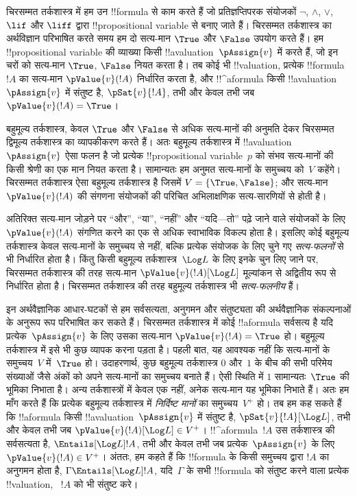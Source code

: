 \documentclass[../../../include/open-logic-section]{subfiles}
\begin{document}


चिरसम्मत तर्कशास्त्र में हम उन !!{formula} से काम करते हैं जो
प्रतिज्ञप्तिपरक संयोजकों $\lnot$, $\land$, $\lor$, $\lif$ और $\liff$ द्वारा
!!{propositional variable} से बनाए जाते हैं। चिरसम्मत तर्कशास्त्र का
अर्थविज्ञान परिभाषित करते समय हम दो सत्य-मान $\True$ और $\False$ उपयोग
करते हैं। हम !!{propositional variable} की व्याख्या किसी
!!a{valuation}~$\pAssign{v}$ में करते हैं, जो इन चरों को सत्य-मान $\True$,
$\False$ नियत करता है। तब कोई भी !!{valuation}, प्रत्येक !!{formula}~$!A$
का सत्य-मान $\pValue{v}(!A)$ निर्धारित करता है, और !!^a{formula} किसी
!!a{valuation}~$\pAssign{v}$ में संतुष्ट है, $\pSat{v}{!A}$, तभी और केवल
तभी जब $\pValue{v}(!A) = \True$।

बहुमूल्य तर्कशास्त्र, केवल $\True$ और $\False$ से अधिक सत्य-मानों की अनुमति
देकर चिरसम्मत द्विमूल्य तर्कशास्त्र का व्यापकीकरण करते हैं। अतः बहुमूल्य
तर्कशास्त्र में !!a{valuation}~$\pAssign{v}$ ऐसा फलन है जो प्रत्येक
!!{propositional variable}~$p$ को संभव सत्य-मानों की किसी श्रेणी का एक मान
नियत करता है। सामान्यतः हम अनुमत सत्य-मानों के समुच्चय को~$V$ कहेंगे।
चिरसम्मत तर्कशास्त्र ऐसा बहुमूल्य तर्कशास्त्र है जिसमें $V = \{\True,
\False\}$; और सत्य-मान~$\pValue{v}(!A)$ की संगणना संयोजकों की परिचित
अभिलाक्षणिक सत्य-सारणियों से होती है।

अतिरिक्त सत्य-मान जोड़ने पर ``और'', ``या'', ``नहीं'' और ``यदि---तो'' पढ़े
जाने वाले संयोजकों के लिए~$\pValue{v}(!A)$ संगणित करने का एक से अधिक
स्वाभाविक विकल्प होता है। इसलिए कोई बहुमूल्य तर्कशास्त्र केवल सत्य-मानों के
समुच्चय से नहीं, बल्कि प्रत्येक संयोजक के लिए चुने गए \emph{सत्य-फलनों} से
भी निर्धारित होता है। किंतु किसी बहुमूल्य तर्कशास्त्र~$\Log L$ के लिए इनके
चुन लिए जाने पर, चिरसम्मत तर्कशास्त्र की तरह सत्य-मान
$\pValue{v}(!A)[\Log L]$ मूल्यांकन से अद्वितीय रूप से निर्धारित होता है।
चिरसम्मत तर्कशास्त्र की तरह बहुमूल्य तर्कशास्त्र भी \emph{सत्य-फलनीय} हैं।

इन अर्थवैज्ञानिक आधार-घटकों से हम सर्वसत्यता, अनुगमन और संतुष्ट्यता की
अर्थवैज्ञानिक संकल्पनाओं के अनुरूप रूप परिभाषित कर सकते हैं। चिरसम्मत
तर्कशास्त्र में कोई !!a{formula} सर्वसत्य है यदि प्रत्येक~$\pAssign{v}$ के
लिए उसका सत्य-मान $\pValue{v}(!A) = \True$ हो। बहुमूल्य तर्कशास्त्र में इसे
भी कुछ व्यापक करना पड़ता है। पहली बात, यह आवश्यक नहीं कि सत्य-मानों के
समुच्चय~$V$ में~$\True$ हो। उदाहरणार्थ, कुछ बहुमूल्य तर्कशास्त्र $0$ और~$1$
के बीच की सभी परिमेय संख्याओं जैसे अंकों को अपने सत्य-मानों का समुच्चय
बनाते हैं। ऐसी स्थिति में $1$ सामान्यतः~$\True$ की भूमिका निभाता है। अन्य
तर्कशास्त्रों में केवल एक नहीं, अनेक सत्य-मान यह भूमिका निभाते हैं। अतः हम
माँग करते हैं कि प्रत्येक बहुमूल्य तर्कशास्त्र में \emph{निर्दिष्ट मानों}
का समुच्चय~$V^+$ हो। तब हम कह सकते हैं कि !!a{formula} किसी
!!a{valuation}~$\pAssign{v}$ में संतुष्ट है, $\pSat{v}{!A}[\Log L]$, तभी और
केवल तभी जब $\pValue{v}(!A)[\Log L] \in V^+$। !!^a{formula}~$!A$ उस
तर्कशास्त्र की सर्वसत्यता है, $\Entails[\Log L] !A$, तभी और केवल तभी जब
प्रत्येक~$\pAssign{v}$ के लिए $\pValue{v}(!A) \in V^+$। अंततः, हम कहते हैं
कि !!{formula} के किसी समुच्चय द्वारा $!A$ का अनुगमन होता है, $\Gamma
\Entails[\Log L] !A$, यदि~$\Gamma$ के सभी !!{formula} को संतुष्ट करने वाला
प्रत्येक !!{valuation}, ~$!A$ को भी संतुष्ट करे।
\end{document}

